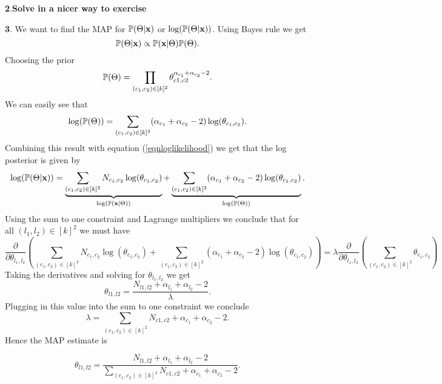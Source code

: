 \documentclass{article}
\begin{document}
\textbf{2}.\textbf{Solve in a nicer way to exercise}
\newline

\textbf{3}. We want to find the MAP for $\mathbb{P}(\Theta|\textbf{x})$ or $\log(\mathbb{P}(\Theta|\textbf{x}))$. Using Bayes rule we get
\begin{equation*}
\mathbb{P}(\Theta|\textbf{x})\propto\mathbb{P}(\textbf{x}|\Theta)\mathbb{P}(\Theta).
\end{equation*}
Choosing the prior 
\begin{equation*}
\mathbb{P}(\Theta)=\prod_{(c_{1},c_{2})\in [k]^{2}}\theta_{c1,c2}^{\alpha_{c_{1}}+\alpha_{c_{2}}-2}.
\end{equation*}
We can easily see that 
\begin{equation*}
\log(\mathbb{P}(\Theta))=\sum_{(c_1,c_2)\in [k]^{2}}(\alpha_{c_{1}}+\alpha_{c_{2}}-2)\log(\theta_{c_1,c_2}).
\end{equation*}
Combining this result with equation (\ref{eqnloglikelihood}) we get that the log posterior is given by
\begin{equation*}
\log(\mathbb{P}(\Theta|\textbf{x}))=\underbrace{\sum_{(c_1,c_2)\in[k]^{2}}N_{c_1,c_2}\log(\theta_{c_1,c_2})}_{\log(\mathbb{P}(\textbf{x}|\Theta))}+
\underbrace{\sum_{(c_1,c_2)\in [k]^{2}}(\alpha_{c_{1}}+\alpha_{c_{2}}-2)\log(\theta_{c_1,c_2})}_{\log(\mathbb{P}(\Theta))}.
\end{equation*}
Using the sum to one constraint and Lagrange multipliers we conclude that for all $(l_{1},l_{2})\in [k]^{2}$ we must  have
\begin{equation*}
\frac{\partial}{\partial\theta_{l_1,l_2}}(\sum_{(c_1,c_2)\in[k]^{2}}N_{c_1,c_2}\log(\theta_{c_1,c_2})+
\sum_{(c_1,c_2)\in [k]^{2}}(\alpha_{c_{1}}+\alpha_{c_{2}}-2)\log(\theta_{c_1,c_2}))=
\lambda\frac{\partial}{\partial\theta_{l_1,l_2}}(\sum_{(c_1,c_2)\in [k]^{2}}\theta_{c_1,c_2})
\end{equation*}
Taking the derivatives and solving for $\theta_{l_1,l_2}$ we get
\begin{equation*}
\theta_{l1,l2}=\frac{N_{l1,l2} +\alpha_{l_{1}}+\alpha_{l_{2}}-2}{\lambda}.
\end{equation*}
Plugging in this value into the sum to one constraint we conclude
\begin{equation*}
\lambda=\sum_{(c_1,c_2)\in [k]^{2}}N_{c1,c2}+\alpha_{c_{1}}+\alpha_{c_{2}}-2.
\end{equation*}
Hence the MAP estimate is


\begin{equation*}
\theta_{l1,l2}=\frac{N_{l1,l2} +\alpha_{l_{1}}+\alpha_{l_{2}}-2}{\sum_{(c_1,c_2)\in [k]^{2}}N_{c1,c2}+\alpha_{c_{1}}+\alpha_{c_{2}}-2}.
\end{equation*}
\end{document}
